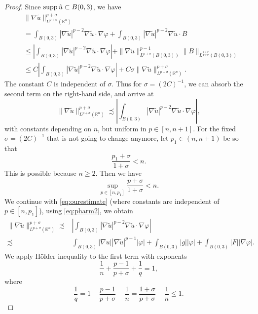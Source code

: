 \documentclass[12pt]{amsart}
\def\supp{{\rm supp\,}}
\newcommand{\R}{\mathbb{R}}
\newcommand{\abs}[1]{\left |#1 \right |}
\numberwithin{theorem}{section} \numberwithin{equation}{section}
\newcommand{\aleq}{\precsim}
\begin{document}
\begin{proof}
Since $\supp \tilde{u} \subset B(0,3)$, we have
\[
\begin{split}
 &\|\nabla \tilde{u} \|_{L^{p+\sigma}(\R^n)}^{p+\sigma}\\
 &=\int_{B(0,3)} |\nabla \tilde{u}|^{p-2} \nabla \tilde{u} \cdot \nabla \varphi + \int_{B(0,3)} |\nabla \tilde{u}|^{p-2} \nabla \tilde{u} \cdot B\\
 &\leq\abs{\int_{B(0,3)} |\nabla \tilde{u}|^{p-2} \nabla \tilde{u} \cdot \nabla \varphi} + \|\nabla \tilde{u} \|_{L^{p+\sigma}(B(0,3))}^{p-1} \|B\|_{L^{\frac{p+\sigma}{1+\sigma}}(B(0,3))}\\
 &\le C\abs{\int_{B(0,3)} |\nabla \tilde{u}|^{p-2} \nabla \tilde{u} \cdot \nabla \varphi} + C\sigma \|\nabla \tilde{u} \|_{L^{p+\sigma}(\R^n)}^{p+\sigma}.
 \end{split}
\]
The  constant $C$ is independent of $\sigma$. Thus for $\sigma = (2C)^{-1}$, we can absorb the second term on the right-hand side, and arrive at 
\begin{equation}\label{eq:ourestimate}
 \|\nabla \tilde{u} \|_{L^{p+\sigma}(\R^n)}^{p+\sigma} \aleq\abs{\int_{B(0,3)} |\nabla \tilde{u}|^{p-2} \nabla \tilde{u} \cdot \nabla \varphi},
\end{equation}
with constants depending on $n$, but uniform in $p \in [n,n+1]$. 
For the fixed $\sigma = (2C)^{-1}$ that is not going to change anymore, let $p_1 \in (n,n+1)$ be so that 
\[
\frac{p_1+\sigma}{1+\sigma} < n. 
\]
This is possible because $n \geq 2$. Then we have
\begin{equation} \label{eq:sup_p}
 \sup_{p \in [n,p_1]} \frac{p+\sigma}{1+\sigma} < n .
\end{equation} 
We continue with \eqref{eq:ourestimate} (where constants are independent of $p \in [n,p_1]$), using \eqref{eq:pharm2}, we obtain
\begin{equation}\label{eq:number1}
\begin{split} 
	\|\nabla \tilde{u} \|_{L^{p+\sigma}(\R^n)}^{p+\sigma}
	\aleq&\abs{\int_{B(0,3)} |\nabla \tilde{u}|^{p-2} \nabla \tilde{u} \cdot \nabla \varphi}\\
	\aleq&\int_{B(0,3)} |\nabla u| |\nabla \tilde{u}|^{p-1} \abs{\varphi}+\int_{B(0,3)} \abs{g} \abs{\varphi}
	+\int_{B(0,3)} \abs{F} \abs{\nabla \varphi}.
\end{split} 
\end{equation}
We apply Hölder inequality to the first term with exponents 
\[
\frac{1}{n} + \frac{p-1}{p+\sigma} + \frac{1}{q} = 1,
\]
where
\[
	\frac{1}{q} = 1-\frac{p-1}{p+\sigma} - \frac{1}{n} = \frac{1+\sigma}{p+\sigma} - \frac{1}{n}\leq 1.
\]
\end{proof}
\end{document}
